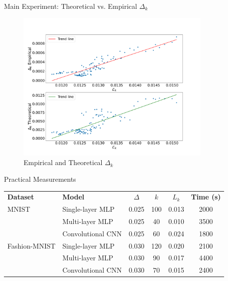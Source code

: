\documentclass{beamer}
\begin{document}
\begin{frame}{Main Experiment: Theoretical vs. Empirical $\Delta_k$}
    \begin{figure}
        \centering
        \includegraphics[width=0.85\textwidth]{img/delta_loss_1_10_1024.pdf}
        \caption*{\tiny Empirical and Theoretical $\Delta_k$}
    \end{figure}
\end{frame}

\begin{frame}{Practical Measurements}
    \begin{table}
        \centering
        \small
        \begin{tabularx}{\textwidth}{|l|>{\raggedright\arraybackslash}X|c|c|c|c|}
            \hline
            \textbf{Dataset}
                          & \textbf{Model}    & \(\Delta\) & \(k\) & \(L_k\) & \textbf{Time (s)} \\
            \hhline{|=|=|=|=|=|=|}
            MNIST         & Single-layer MLP  & 0.025      & 100   & 0.013   & 2000              \\
                          & Multi-layer MLP   & 0.025      & 40    & 0.010   & 3500              \\
                          & Convolutional CNN & 0.025      & 60    & 0.024   & 1800              \\
            \hline
            Fashion-MNIST & Single-layer MLP  & 0.030      & 120   & 0.020   & 2100              \\
                          & Multi-layer MLP   & 0.030      & 90    & 0.017   & 4400              \\
                          & Convolutional CNN & 0.030      & 70    & 0.015   & 2400              \\
            \hline
        \end{tabularx}
    \end{table}
\end{frame}
\end{document}
